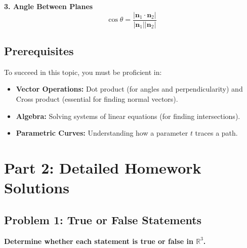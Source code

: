 \documentclass[11pt]{article}
\begin{document}
\textbf{3. Angle Between Planes}
\[ \cos \theta = \frac{|\mathbf{n}_1 \cdot \mathbf{n}_2|}{|\mathbf{n}_1| |\mathbf{n}_2|} \]

\subsection{Prerequisites}
To succeed in this topic, you must be proficient in:
\begin{itemize}
    \item \textbf{Vector Operations:} Dot product (for angles and perpendicularity) and Cross product (essential for finding normal vectors).
    \item \textbf{Algebra:} Solving systems of linear equations (for finding intersections).
    \item \textbf{Parametric Curves:} Understanding how a parameter $t$ traces a path.
\end{itemize}

\newpage

\section{Part 2: Detailed Homework Solutions}

\subsection*{Problem 1: True or False Statements}
\textbf{Determine whether each statement is true or false in $\mathbb{R}^3$.}
\end{document}

